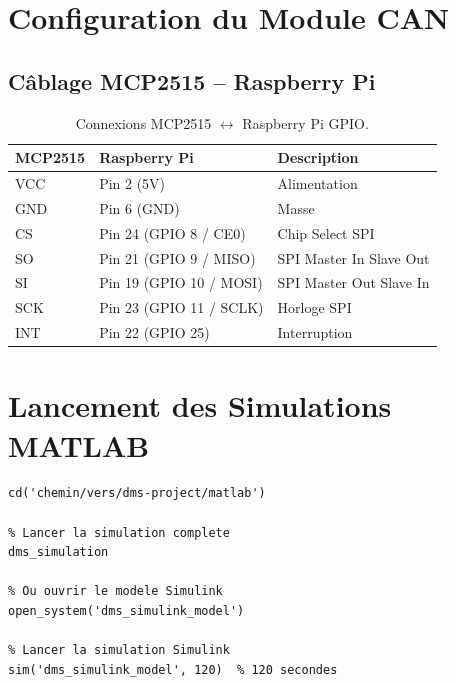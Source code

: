 \section{Configuration du Module CAN}

\subsection{Câblage MCP2515 -- Raspberry Pi}

\begin{table}[H]
\centering
\caption{Connexions MCP2515 $\leftrightarrow$ Raspberry Pi GPIO.}
\renewcommand{\arraystretch}{1.3}
\begin{tabular}{|l|l|l|}
\hline
\rowcolor{stellantisblue!15}
\textbf{MCP2515} & \textbf{Raspberry Pi} & \textbf{Description} \\
\hline
VCC & Pin 2 (5V) & Alimentation \\
\hline
GND & Pin 6 (GND) & Masse \\
\hline
CS & Pin 24 (GPIO 8 / CE0) & Chip Select SPI \\
\hline
SO & Pin 21 (GPIO 9 / MISO) & SPI Master In Slave Out \\
\hline
SI & Pin 19 (GPIO 10 / MOSI) & SPI Master Out Slave In \\
\hline
SCK & Pin 23 (GPIO 11 / SCLK) & Horloge SPI \\
\hline
INT & Pin 22 (GPIO 25) & Interruption \\
\hline
\end{tabular}
\end{table}

\section{Lancement des Simulations MATLAB}

\begin{lstlisting}[style=matlabstyle, caption={Lancement de la simulation MATLAB.}]
% Ouvrir MATLAB et naviguer vers le dossier du projet
cd('chemin/vers/dms-project/matlab')

% Lancer la simulation complete
dms_simulation

% Ou ouvrir le modele Simulink
open_system('dms_simulink_model')

% Lancer la simulation Simulink
sim('dms_simulink_model', 120)  % 120 secondes
\end{lstlisting}
